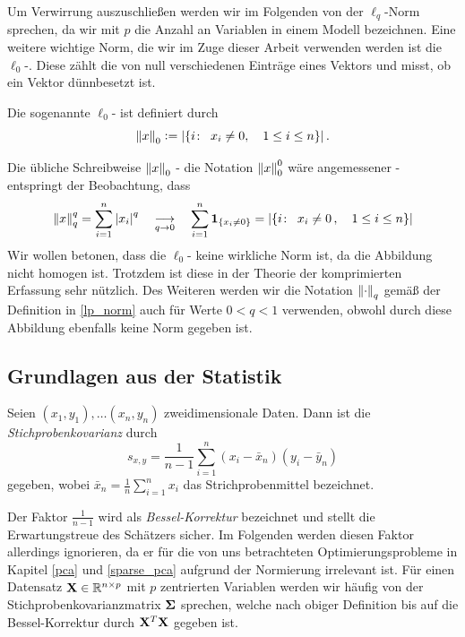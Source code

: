 Um Verwirrung auszuschließen werden wir im Folgenden von der $\ell_q$-Norm sprechen, da wir mit $p$ die Anzahl an Variablen in einem Modell bezeichnen. Eine weitere wichtige Norm, die wir im Zuge dieser Arbeit verwenden werden ist die $\ell_0$-. Diese zählt die von null verschiedenen Einträge eines Vektors und misst, ob ein Vektor dünnbesetzt ist.

\begin{defn}
Die sogenannte $\ell_0$- ist definiert durch
$$\left\lVert x \right\rVert_{0} \vcentcolon= \left|\{i \colon \enspace x_i \neq 0 , \quad 1 \leq i \leq n\}\right|.$$
\end{defn}

Die übliche Schreibweise $\left\lVert x \right\rVert_0$ - die Notation $\left\lVert x \right\rVert_{0}^{0}$ wäre angemessener - entspringt der Beobachtung, dass 
$$\left\lVert x \right\rVert_{q}^{q} = \sum_{i=1}^{n} \left\lvert x_i \right\rvert^q \quad \underset{q \rightarrow 0}{\longrightarrow} \quad \sum_{i=1}^{n} \mathbf{1}_{\{x_i \neq 0\}} = \left|\{i \colon \enspace x_i \neq 0\, , \quad 1 \leq i \leq n\}\right|$$
Wir wollen betonen, dass die $\ell_0$- keine wirkliche Norm ist, da die Abbildung nicht homogen ist. Trotzdem ist diese  in der Theorie der komprimierten Erfassung sehr nützlich. Des Weiteren werden wir die Notation $\left\lVert \cdot \right\rVert_q$ gemäß der Definition in \ref{lp_norm} auch für Werte $0 < q < 1$ verwenden, obwohl durch diese Abbildung ebenfalls keine Norm gegeben ist.

\subsection{Grundlagen aus der Statistik}

\begin{defn}
Seien $(x_1, y_1), \ldots (x_n, y_n)$ zweidimensionale Daten. Dann ist die \textit{Stichprobenkovarianz} durch
$$s_{x,y} = \frac{1}{n-1} \sum_{i=1}^n (x_i - \bar{x}_n)(y_i - \bar{y}_n)$$
gegeben, wobei $\bar{x}_n = \frac{1}{n}\sum _{i=1}^{n}x_{i}$ das Strichprobenmittel bezeichnet.
\end{defn}

Der Faktor $\frac{1}{n-1}$ wird als \textit{Bessel-Korrektur} bezeichnet und stellt die Erwartungstreue des Schätzers sicher. Im Folgenden werden diesen Faktor allerdings ignorieren, da er für die von uns betrachteten Optimierungsprobleme in Kapitel \ref{pca} und \ref{sparse_pca} aufgrund der Normierung irrelevant ist. Für einen Datensatz $\mathbf{X} \in \mathbb{R}^{n \times p}$ mit $p$ zentrierten Variablen werden wir häufig von der Stichprobenkovarianzmatrix $\mathbf{\Sigma}$ sprechen, welche nach obiger Definition bis auf die Bessel-Korrektur durch $\mathbf{X}^T\mathbf{X}$ gegeben ist.

